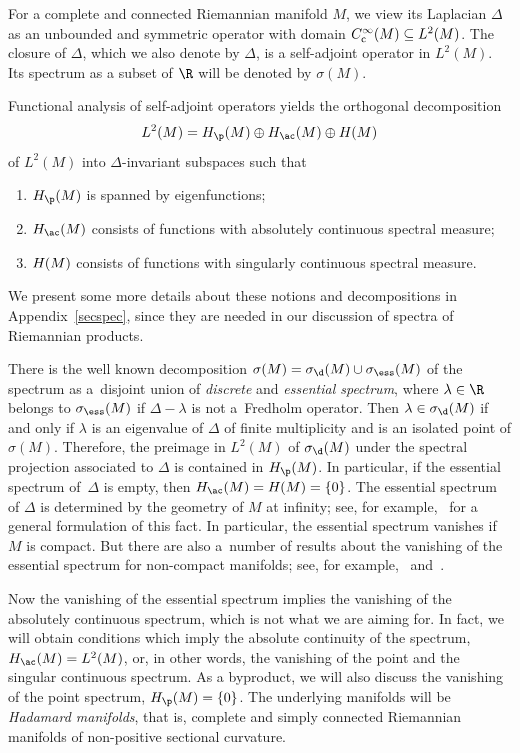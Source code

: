 For a complete and connected Riemannian manifold $M$, we view its Laplacian $\Delta$
as an unbounded and symmetric operator with domain $C^\infty_{\rm c}(M) \subseteq L^2(M)$.
The closure of $\Delta$, which we also denote by $\Delta$, is a self-adjoint operator in $L^2(M)$.
Its spectrum as a subset of $\R$ will be denoted by $\sigma(M)$.

Functional analysis of self-adjoint operators yields the orthogonal decomposition
\begin{align*}%
L^2(M) = H_{\p}(M) \oplus H_{\ac}(M) \oplus H_{\sc}(M)
\end{align*}
of $L^2(M)$ into $\Delta$-invariant subspaces such that
\begin{enumerate}\itemsep=0pt
\item[(1)] $H_{\p}(M)$ is spanned by eigenfunctions;
\item[(2)] $H_{\ac}(M)$ consists of functions with absolutely continuous spectral measure;
\item[(3)] $H_{\sc}(M)$ consists of functions with singularly continuous spectral measure.
\end{enumerate}
We present some more details about these notions and decompositions in Appendix~\ref{secspec},
since they are needed in our discussion of spectra of Riemannian products.

There is the well known decomposition $\sigma(M)=\sigma_{\d}(M)\cup\sigma_{\ess}(M)$ of the spectrum
as a~disjoint union of \emph{discrete} and \emph{essential spectrum},
where $\lambda\in\R$ belongs to $\sigma_{\ess}(M)$ if $\Delta-\lambda$ is not a~Fredholm operator.
Then $\lambda\in\sigma_{\d}(M)$ if and only if $\lambda$ is an eigenvalue of $\Delta$
of finite multiplicity and is an isolated point of $\sigma(M)$.
Therefore, the preimage in $L^2(M)$ of $\sigma_{\d}(M)$ under the spectral projection associated to $\Delta$
is contained in $H_{\p}(M)$.
In particular, if the essential spectrum of~$\Delta$ is empty, then $H_{\ac}(M)=H_{\sc}(M)=\{0\}$.
The essential spectrum of $\Delta$ is determined by the geometry of $M$ at infinity;
see, for example,~\cite[Proposition 3.6]{BMM17} for a general formulation of this fact.
In particular, the essential spectrum vanishes if $M$ is compact.
But there are also a~number of results about the vanishing of the essential spectrum
for non-compact manifolds;
see, for example,~\cite[Theorems 1.1 and 1.2]{BLM10} and~\cite[Examples 3.7]{BMM17}.

Now the vanishing of the essential spectrum implies the vanishing of the absolutely continuous spectrum,
which is not what we are aiming for.
In fact, we will obtain conditions which imply the absolute continuity of the spectrum, $H_{\ac}(M)=L^2(M)$,
or, in other words, the vanishing of the point and the singular continuous spectrum.
As a byproduct, we will also discuss the vanishing of the point spectrum, $H_{\p}(M)=\{0\}$.
The underlying manifolds will be \emph{Hadamard manifolds}, that is,
complete and simply connected Riemannian manifolds of non-positive sectional curvature.

